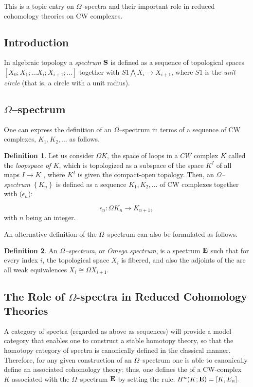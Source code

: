 \documentclass[12pt]{article}
\theoremstyle{plain}
\theoremstyle{definition}
\newtheorem{definition}{Definition}[section]
\numberwithin{equation}{section}
\begin{document}
This is a topic entry on $\Omega$--spectra and their important role in reduced cohomology theories
on CW complexes.

\subsection{Introduction}
In algebraic topology a \emph{spectrum} ${\bf S}$ is defined as a 
sequence of topological spaces $[X_0;X_1;... X_i;X_{i+1};... ]$ together with 
 $S1 \bigwedge X_i \to X_{i+1}$, where $S1$ is the \emph{unit circle} (that is, a circle with a unit radius). 

\subsection{$\Omega$--spectrum}
 One can express the definition of an $\Omega$--spectrum in terms of a sequence of CW
complexes, $K_1,K_2,...$ as follows.

\begin{definition}
Let us consider $\Omega K$, the space of loops in a $CW$ complex $K$ called
the {\em loopspace of $K$}, which is topologized as a subspace of the space $K^I$
of all maps $I \to K$ , where $K^I$ is given the compact-open topology.
Then, an \emph{$\Omega$--spectrum} $\left\{ K_n\right\}$ is defined as a
sequence $K_1,K_2,...$ of CW complexes together with  ($\epsilon_n$):

$$\epsilon_n: \Omega K_n \to K_{n + 1},$$ with $n$ being an integer. 
\end{definition}
 
An alternative definition of the $\Omega$--spectrum can also be formulated as follows.

\begin{definition}
An \emph{$\Omega$--spectrum}, or \emph{Omega spectrum}, is a spectrum ${\bf E}$ such that for every index $i$, 
the topological space $X_i$ is fibered, and also the adjoints of the  are all weak equivalences $X_i \cong \Omega X_{i+1}$.
\end{definition}

\subsection{The Role of $\Omega$-spectra in Reduced Cohomology Theories}


 A category of spectra (regarded as above as sequences) will provide a model category that enables one to construct a stable homotopy theory, so that the homotopy category of spectra is canonically defined in the classical manner. Therefore, for any given construction of an $\Omega$--spectrum one is able to canonically define an associated cohomology theory; thus, one defines the  of a CW-complex $K$ associated with the $\Omega$--spectrum ${\bf E}$ by setting the rule: 
$H^n(K;{\bf E}) = [K, E_n].$ 
\end{document}
